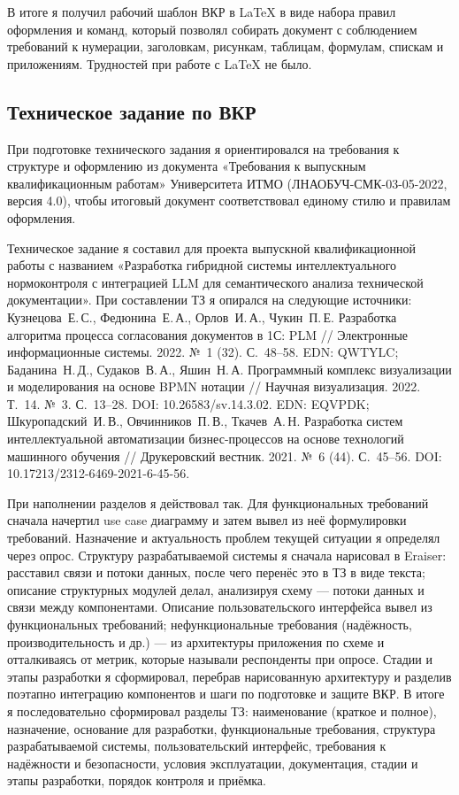 В итоге я получил рабочий шаблон ВКР в LaTeX в виде набора правил оформления и команд, который позволял собирать документ с соблюдением требований к нумерации, заголовкам, рисункам, таблицам, формулам, спискам и приложениям. Трудностей при работе с LaTeX не было.


\subsection{Техническое задание по ВКР}

При подготовке технического задания я ориентировался на требования к структуре 
и оформлению из документа «Требования к выпускным квалификационным работам» Университета ИТМО (ЛНАОБУЧ-СМК-03-05-2022, версия 4.0), 
чтобы итоговый документ соответствовал единому стилю и правилам оформления.

Техническое задание я составил для проекта выпускной квалификационной работы с названием «Разработка гибридной системы интеллектуального нормоконтроля с интеграцией LLM для семантического анализа технической документации».
При составлении ТЗ я опирался на следующие источники: Кузнецова~Е.\,С., Федюнина~Е.\,А., Орлов~И.\,А., Чукин~П.\,Е. Разработка алгоритма процесса согласования документов в 1С: PLM // Электронные информационные системы. 2022. №~1 (32). С.~48--58. EDN: QWTYLC; Баданина~Н.\,Д., Судаков~В.\,А., Яшин~Н.\,А. Программный комплекс визуализации и моделирования на основе BPMN нотации // Научная визуализация. 2022. Т.~14. №~3. С.~13--28. DOI: 10.26583/sv.14.3.02. EDN: EQVPDK; Шкуропадский~И.\,В., Овчинников~П.\,В., Ткачев~А.\,Н. Разработка систем интеллектуальной автоматизации бизнес-процессов на основе технологий машинного обучения // Друкеровский вестник. 2021. №~6 (44). С.~45--56. DOI: 10.17213/2312-6469-2021-6-45-56.

При наполнении разделов я действовал так.
Для функциональных требований сначала начертил use case диаграмму и затем вывел из неё формулировки требований.
Назначение и актуальность проблем текущей ситуации я определял через опрос.
Структуру разрабатываемой системы я сначала нарисовал в Eraiser: расставил связи и потоки данных, после чего перенёс это в ТЗ в виде текста; описание структурных модулей делал, анализируя схему --- потоки данных и связи между компонентами.
Описание пользовательского интерфейса вывел из функциональных требований; нефункциональные требования (надёжность, производительность и др.) --- из архитектуры приложения по схеме и отталкиваясь от метрик, которые называли респонденты при опросе.
Стадии и этапы разработки я сформировал, перебрав нарисованную архитектуру и разделив поэтапно интеграцию компонентов и шаги по подготовке и защите ВКР.
В итоге я последовательно сформировал разделы ТЗ: наименование (краткое и полное), назначение, основание для разработки, функциональные требования, структура разрабатываемой системы, пользовательский интерфейс, требования к надёжности и безопасности, условия эксплуатации, документация, стадии и этапы разработки, порядок контроля и приёмка.

